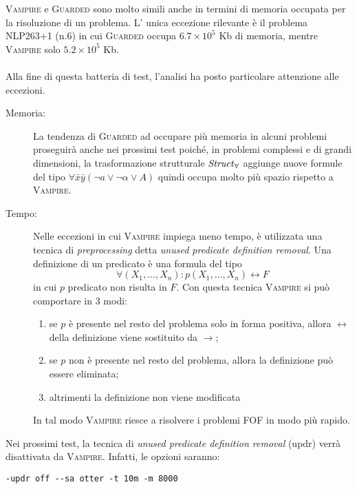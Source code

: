 \textsc{Vampire} e \textsc{Guarded} sono molto simili anche in termini di memoria occupata per la risoluzione di un problema.
L' unica eccezione rilevante 
è il problema NLP263+1 (n.6) in cui \textsc{Guarded} occupa $6.7\times10^5$ Kb di memoria, mentre \textsc{Vampire} solo $5.2\times10^5$ Kb.\\\\
Alla fine di questa batteria di test, l'analisi ha posto particolare attenzione alle eccezioni. 
\begin{description}
    \item[Memoria:] La tendenza di \textsc{Guarded} ad occupare più memoria in alcuni problemi proseguirà anche nei prossimi test
    poiché, in problemi complessi e di grandi dimensioni, la trasformazione strutturale 
    $\text{\emph{Struct}}_\forall$ aggiunge nuove formule del tipo $\forall\bar{x}\bar{y}(\lnot a \lor \lnot\alpha \lor A)$ 
    quindi occupa molto più spazio rispetto a \textsc{Vampire}.
    \item[Tempo:] Nelle eccezioni in cui \textsc{Vampire} impiega meno tempo, è utilizzata
    una tecnica di \emph{preprocessing} detta \emph{unused predicate definition removal}.
    Una definizione di un predicato è una formula del tipo 
    \[\forall(X_1,\dots,X_n) : p(X_1, \dots, X_n) \leftrightarrow F\]
    in cui $p$ predicato non risulta in $F$. 
    Con questa tecnica \textsc{Vampire} si può comportare in 3 modi:
    \begin{enumerate}
        \item se $p$ è presente nel resto del problema solo in forma positiva, allora $\leftrightarrow$ della definizione
        viene sostituito da $\rightarrow$;
        \item se $p$ non è presente nel resto del problema, allora la definizione può essere eliminata;
        \item altrimenti la definizione non viene modificata
    \end{enumerate}
    In tal modo \textsc{Vampire} riesce a risolvere i problemi FOF in modo più rapido.
\end{description}

Nei prossimi test, la tecnica di \emph{unused predicate definition removal} (updr) 
verrà disattivata da \textsc{Vampire}. Infatti, le opzioni saranno:
\begin{center}
    \verb|-updr off --sa otter -t 10m -m 8000|    
\end{center}

